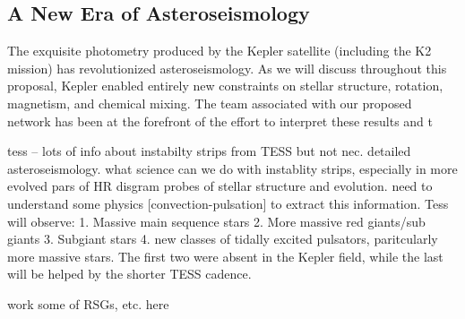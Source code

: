 {\color{blue}
\subsection{A New Era of Asteroseismology}

The exquisite photometry produced by the Kepler satellite (including the K2 mission) has revolutionized asteroseismology.   As we will discuss throughout this proposal, Kepler enabled entirely new constraints on stellar structure, rotation, magnetism, and chemical mixing.   The team associated with our proposed network has been at the forefront of the effort to interpret these results and t

tess -- lots of info about instabilty strips from TESS but not nec. detailed asteroseismology.  what science can we do with instablity strips, especially in more evolved pars of HR disgram  probes of stellar structure and evolution.   need to understand some physics [convection-pulsation] to extract this information.   Tess will observe: 1. Massive main sequence stars 2. More massive red giants/sub giants 3. Subgiant stars 4.  new classes of tidally excited pulsators, paritcularly more massive stars.   The first two were absent in the Kepler field, while the last will be helped by the shorter TESS cadence.

work some of RSGs, etc. here




}